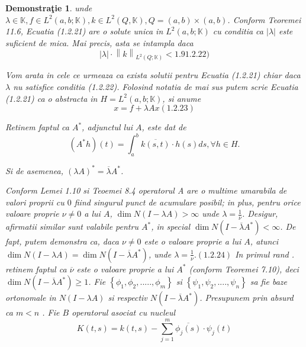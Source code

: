 \documentclass[a4paper,12pt,oneside]{report}
\newtheorem{demonstration}{Demonstra\c tie}
\begin{document}
\begin{demonstration}
		unde \(\lambda \in \mathbb{K}, f\in L^{2}\left ( a,b; \mathbb{K} \right ), k\in L^{2} \left ( Q,\mathbb{K} \right ), Q = \left ( a,b \right )\times \left ( a,b \right )\). Conform Teoremei 11.6, Ecuatia (1.2.21) are o solute unica in \(L^{2}\left ( a,b;\mathbb{K} \right )\) cu conditia ca \(\left | \lambda  \right |\) este suficient de mica. Mai precis, asta se intampla daca 
		\begin{displaymath}
			\left | \lambda  \right | \cdot \left \| k \right \|_{L^{2}\left ( Q;\mathbb{K} \right )}< 1. 91.2.22)
		\end{displaymath}
										
		Vom arata in cele ce urmeaza ca exista solutii pentru Ecuatia (1.2.21) chiar daca \(\lambda\) nu satisfice conditia (1.2.22). Folosind notatia de mai sus putem scrie Ecuatia (1.2.21) ca o abstracta in \(H = L^{2}\left ( a,b; \mathbb{K} \right )\), si anume 
		\begin{displaymath}
			x = f + \lambda Ax(1.2.23)
		\end{displaymath}
										
		Retinem faptul ca \(A^{\ast }\), adjunctul lui \(A\), este dat de 
		\begin{displaymath}
			\left (A^{\ast }h  \right )\left ( t \right ) = \int_{a}^{b}\overline{k\left ( s,t \right )}\cdot h\left ( s \right )ds, \forall h \in H. 
		\end{displaymath}
										
		Si de asemenea, \(\left ( \lambda A \right )^{\ast } = \overline{\lambda }A^{\ast }\). 
											
		Conform Lemei 1.10 si Teoemei 8.4 operatorul A are o multime umarabila de valori proprii cu \(0\) fiind singurul punct de acumulare posibil; in plus, pentru orice valoare proprie \(\nu \neq 0\) a lui \(A\), \(\dim N\left ( I-\lambda A \right )> \infty\) unde \(\lambda = \frac{1}{\nu }\). Desigur, afirmatii similar sunt valabile pentru \(A^{\ast }\), in special \(\dim N\left ( I-\overline{\lambda }A^{\ast } \right )< \infty\). De fapt, putem demonstra ca, daca \(\nu \neq 0\) este o valoare proprie a lui \(A\), atunci \(\dim N\left ( I-\lambda A \right ) = \dim N\left ( I - \overline{\lambda } A^{\ast }\right )\), unde \(\lambda  = \frac{1}{\nu }. (1.2.24) \)
		In primul rand . retinem faptul ca \(\overline{\nu }\) este o valoare proprie a lui \(A^{\ast }\) (conform Teoremei 7.10), deci \(\dim N\left ( I - \overline{\lambda }A^{\ast } \right )\geq 1\). Fie \(\left \{ \phi _{1}, \phi _{2},.....,\phi _{m} \right \}\) si \(\left \{ \psi _{1}, \psi _{2},....,\psi _{n} \right \}\) sa fie baze ortonomale in \(N \left ( I-\lambda A \right )\) si respectiv \(N \left ( I-\overline{\lambda} A^{\ast } \right )\). Presupunem prin absurd ca \(m< n\) . Fie \(B\) operatorul asociat cu nucleul 
		\begin{displaymath}
			K\left ( t,s \right ) = k\left ( t,s \right ) - \sum_{j=1}^{m}\overline{\phi _{j}\left ( s \right )}\cdot \psi _{j} \left ( t \right )
		\end{displaymath}
										

\end{demonstration}
\end{document}
